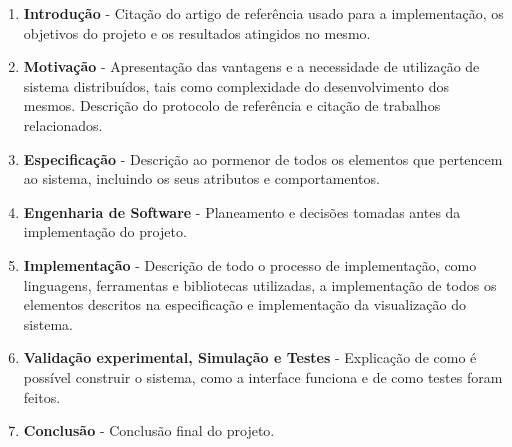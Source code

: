 \begin{enumerate}
    \item \textbf{Introdução} - Citação do artigo de referência usado para a implementação, os objetivos do projeto e os resultados atingidos no mesmo.
    \item \textbf{Motivação} - Apresentação das vantagens e a necessidade de utilização de sistema distribuídos, tais como complexidade do desenvolvimento dos mesmos. Descrição do protocolo de referência e citação de trabalhos relacionados.
    \item \textbf{Especificação} - Descrição ao pormenor de todos os elementos que pertencem ao sistema, incluindo os seus atributos e comportamentos.
    \item \textbf{Engenharia de Software} - Planeamento e decisões tomadas antes da implementação do projeto. 
    \item \textbf{Implementação} - Descrição de todo o processo de implementação, como linguagens, ferramentas e bibliotecas utilizadas, a implementação de todos os elementos descritos na especificação e implementação da visualização do sistema.
    \item \textbf{Validação experimental, Simulação e Testes} - Explicação de como é possível construir o sistema, como a interface funciona e de como testes foram feitos.
    \item \textbf{Conclusão} - Conclusão final do projeto.

\end{enumerate}
